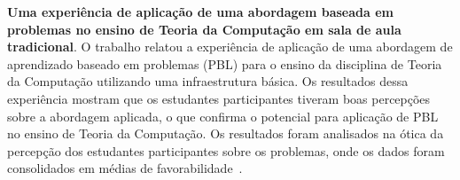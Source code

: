 \item{\textbf{Uma experiência de aplicação de uma
abordagem baseada em problemas no ensino
de Teoria da Computação em sala de aula tradicional}.
O trabalho relatou a experiência de aplicação de uma
abordagem de aprendizado baseado em problemas (PBL) para o ensino da
disciplina de Teoria da Computação utilizando uma infraestrutura básica.
Os resultados dessa experiência mostram que os estudantes participantes
tiveram boas percepções sobre a abordagem aplicada, o que confirma o
potencial para aplicação de PBL no ensino de
Teoria da Computação.
Os resultados foram analisados na ótica da percepção
dos estudantes participantes sobre os problemas, onde os dados
foram consolidados em médias de favorabilidade~\cite{gavaza2017}.}

